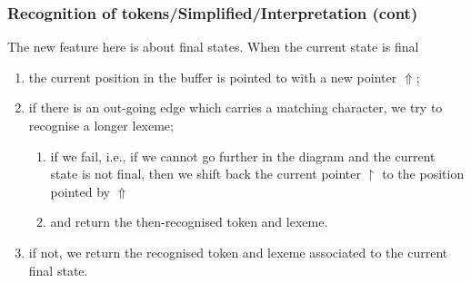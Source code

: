 % 
\begin{frame}
\frametitle{Recognition of tokens/Simplified/Interpretation (cont)}
 
The new feature here is about final states. When the current state is
final
\begin{enumerate}

  \item the current position in the buffer is pointed to with a new
  pointer \(\Uparrow\);

  \item if there is an out-going edge which carries a matching
  character, we try to recognise a longer lexeme;
  \begin{enumerate}
  
    \item if we fail, i.e., if we cannot go further in the diagram and
    the current state is not final, then we shift back the current
    pointer \(\upharpoonright\) to the position pointed
    by \(\Uparrow\)

    \item and return the then-recognised token and lexeme.

  \end{enumerate}

  \item if not, we return the recognised token and lexeme associated
  to the current final state.

\end{enumerate}

\end{frame}


